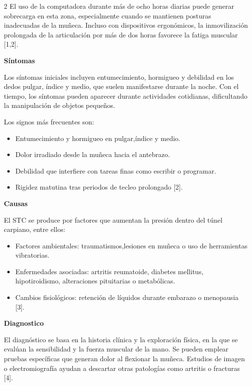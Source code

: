 \documentclass[12pt,spanish,Letterpaper,openany]{book}
\providecommand{\tightlist}{%
  \setlength{\itemsep}{0pt}\setlength{\parskip}{0pt}}
\begin{document}
\begin {multicols}{2}
El uso de la computadora durante más de ocho horas diarias puede generar sobrecarga en esta zona, especialmente cuando se mantienen posturas inadecuadas de la muñeca. Incluso con dispositivos ergonómicos, la inmovilización prolongada de la articulación por más de dos horas favorece la fatiga muscular {[}1,2{]}.

\bigskip
\bigskip

\textbf{Síntomas}

Los síntomas iniciales incluyen entumecimiento, hormigueo y debilidad en los dedos pulgar, índice y medio, que suelen manifestarse durante la noche.
Con el tiempo, los síntomas pueden aparecer durante actividades cotidianas, dificultando la manipulación de objetos pequeños.

Los signos más frecuentes son:

\begin{itemize}
\tightlist
\item
  Entumecimiento y hormigueo en pulgar,índice y medio.
\item
  Dolor irradiado desde la muñeca hacia el antebrazo.
\item
  Debilidad que interfiere con tareas finas como escribir o programar.
\item
  Rigidez matutina tras periodos de tecleo prolongado {[}2{]}.
\end{itemize}

\bigskip

\textbf{Causas}

El STC se produce por factores que aumentan la presión dentro del túnel carpiano, entre ellos:

\begin{itemize}
\tightlist
\item
  Factores ambientales: traumatismos,lesiones en muñeca o uso de herramientas vibratorias.
\item
  Enfermedades asociadas: artritis reumatoide, diabetes mellitus, hipotiroidismo, alteraciones pituitarias o metabólicas.
\item
  Cambios fisiológicos: retención de líquidos durante embarazo o menopausia {[}3{]}.
\end{itemize}

\bigskip

\textbf{Diagnostico}

El diagnóstico se basa en la historia clínica y la exploración física, en la que se evalúan la sensibilidad y la fuerza muscular de la mano. Se pueden emplear pruebas específicas que generan dolor al flexionar la muñeca. Estudios de imagen o electromiografía ayudan a descartar otras patologías como artritis o fracturas {[}4{]}.


\end{multicols}
\end{document}
